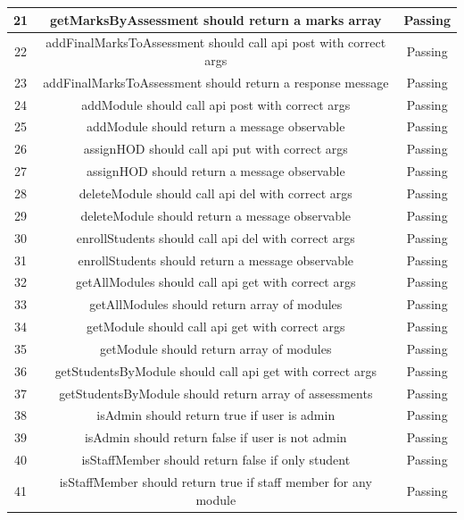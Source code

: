 \documentclass[a4paper,12pt]{article}
\begin{document}
\begin{tabular}{ |c|c|c| }
    			\hline
   				21 & getMarksByAssessment should return a marks array & Passing\\
    			\hline
   				22 & addFinalMarksToAssessment should call api post with correct args & Passing\\
    			\hline
   				23 & addFinalMarksToAssessment should return a response message & Passing\\
    			\hline
   				24 & addModule should call api post with correct args & Passing\\
    			\hline
   				25 & addModule should return a message observable & Passing\\
    			\hline
   				26 & assignHOD should call api put with correct args & Passing\\
    			\hline
   				27 & assignHOD should return a message observable & Passing\\
    			\hline
   				28 & deleteModule should call api del with correct args & Passing\\
    			\hline
   				29 & deleteModule should return a message observable & Passing\\
    			\hline
   				30 & enrollStudents should call api del with correct args & Passing\\
    			\hline
   				31 & enrollStudents should return a message observable & Passing\\
    			\hline
   				32 & getAllModules should call api get with correct args & Passing\\
    			\hline
   				33 & getAllModules should return array of modules & Passing\\
    			\hline
   				34 & getModule should call api get with correct args & Passing\\
    			\hline
   				35 & getModule should return array of modules & Passing\\
    			\hline
   				36 & getStudentsByModule should call api get with correct args & Passing\\
    			\hline
   				37 & getStudentsByModule should return array of assessments & Passing\\
    			\hline
   				38 & isAdmin should return true if user is admin & Passing\\
    			\hline
   				39 & isAdmin should return false if user is not admin & Passing\\
    			\hline
   				40 & isStaffMember should return false if only student & Passing\\
    			\hline
   				41 & isStaffMember should return true if staff member for any module & Passing\\

\end{tabular}
\end{document}
